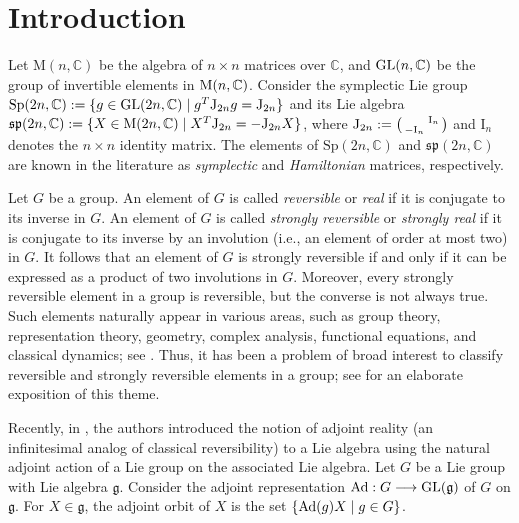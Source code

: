 \documentclass[11pt,reqno]{amsart}
\numberwithin{equation}{section}
\theoremstyle{definition}
\def\C{\mathbb C}
\def\g{\mathcal G}
\def\C{\mathbb {C}}
\def\g{\mathfrak {g}}
\def\lto{\longrightarrow}
\begin{document}
\section{Introduction} 
Let $\mathrm{M}(n,\C)$ be the algebra of $n \times n$ matrices over $\C$, and ${\rm GL}(n,\C) $ be  the group of invertible elements in  ${\rm M}(n,\C)$.  
Consider the symplectic Lie group $ \mathrm{Sp}(2n,\C) := \{ g \in \mathrm{GL}(2n,\C) \mid g^T {\rm J}_{2n} g = {\rm J}_{2n} \}$ and its Lie algebra $\mathfrak{sp}(2n,\C)  := \{ X \in  \mathrm{M}(2n,\C) \mid X^T {\rm J}_{2n}  =- {\rm J}_{2n}X  \}$, where $
{\rm J}_{2n}  :=\begin{psmallmatrix}
	& \mathrm{I}_n\\
	- \mathrm{I}_n & 
\end{psmallmatrix}$ and $ \mathrm{I}_n$ denotes the $ n \times n $ identity matrix.
The elements of $ \mathrm{Sp}(2n,\C) $ and $\mathfrak{sp}(2n,\C)$ are  known in the literature as \textit{symplectic} and \textit{Hamiltonian} matrices, respectively. 


Let $G$ be a group. An element of $ G$ is called \textit{reversible} or \textit{real} if it is conjugate to its inverse in $G$. 
An element of $ G$ is called  \textit{strongly reversible} or \textit{strongly real} if it is conjugate to its inverse by an involution (i.e., an element of order at most two) in $G$.   
It follows that an element of $ G$ is strongly reversible if and only if it can be expressed as a product of two involutions in $ G$. Moreover, every strongly reversible element in a group is reversible, but the converse is not always true. Such elements naturally appear in various areas, such as group theory, representation theory, geometry, complex analysis, functional equations, and classical dynamics; see \cite{ Wo,  TZ, BM,  O'Fa}. Thus, it has been a problem of broad interest    
to classify reversible and strongly reversible elements in a group; see \cite{OS} for an elaborate exposition of this theme.


Recently, in \cite{GM1}, the authors introduced the notion of adjoint reality  (an infinitesimal analog of classical reversibility) to a  Lie algebra using the natural adjoint action of a Lie group on the associated Lie algebra. Let $G$ be a Lie group with Lie algebra $\g$. Consider the  adjoint representation   ${\rm Ad} : G \lto \mathrm{GL}( \mathfrak{g} )$ of $G$ on $\g$. For $X\in \g$, the adjoint orbit of $X$ is the set $\{{\rm Ad}(g)X\mid g\in G \}$. 
\end{document}
